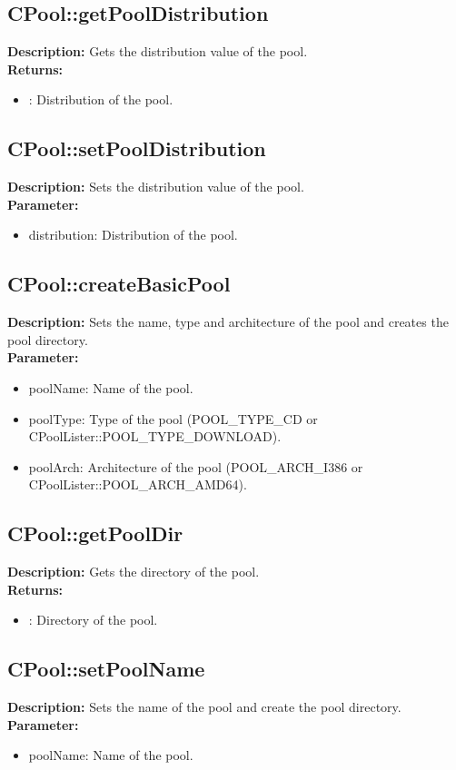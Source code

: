 \subsection{CPool::getPoolDistribution}
\textbf{Description:} Gets the distribution value of the pool.\\
\textbf{Returns:}
\begin{itemize}
\item : Distribution of the pool.
\end{itemize}

\subsection{CPool::setPoolDistribution}
\textbf{Description:} Sets the distribution value of the pool.\\
\textbf{Parameter:}
\begin{itemize}
\item distribution: Distribution of the pool.
\end{itemize}

\subsection{CPool::createBasicPool}
\textbf{Description:} Sets the name, type and architecture of the pool and creates the pool directory.\\
\textbf{Parameter:}
\begin{itemize}
\item poolName: Name of the pool.
\item poolType: Type of the pool (POOL\_TYPE\_CD or CPoolLister::POOL\_TYPE\_DOWNLOAD).
\item poolArch: Architecture of the pool (POOL\_ARCH\_I386 or CPoolLister::POOL\_ARCH\_AMD64).
\end{itemize}

\subsection{CPool::getPoolDir}
\textbf{Description:} Gets the directory of the pool.\\
\textbf{Returns:}
\begin{itemize}
\item : Directory of the pool.
\end{itemize}

\subsection{CPool::setPoolName}
\textbf{Description:} Sets the name of the pool and create the pool directory.\\
\textbf{Parameter:}
\begin{itemize}
\item poolName: Name of the pool.
\end{itemize}

